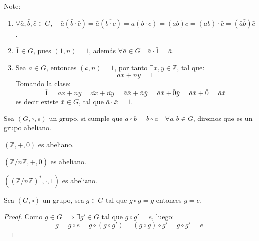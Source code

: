 \begin{enefecto} Note:
	\begin{enumerate}[label=\roman*), font=\normalfont]
		\item $\forall \bar{a}, \bar{b}, \bar{c} \in G, \quad \bar{a}(\bar{b} \cdot \bar{c}) = \bar{a}(\overline{b \cdot c}) = \overline{a(b \cdot c)} = \overline{(ab)c} = \overline{(ab)} \cdot \bar{c} = (\bar{a} \bar{b}) \bar{c}$.
		\item $\bar{1} \in G$, pues $(1, n) = 1$, además $\forall \bar{a} \in G \quad \bar{a} \cdot \bar{1} = \bar{a}$.
		\item Sea $\bar{a} \in G$, entonces $(a, n) = 1$, por tanto $\exists x, y \in \mathbb{Z}$, tal que:
		      \begin{equation*}
			      ax + ny = 1
		      \end{equation*}
		      Tomando la clase:
		      \begin{equation*}
			      \overline{1} = \overline{ax+ny} = \overline{ax} + \overline{ny} = \bar{a}\bar{x} + \bar{n}\bar{y} = \bar{a}\bar{x} + \bar{0}\bar{y} = \bar{a}\bar{x} + \bar{0} = \bar{a}\bar{x}
		      \end{equation*}
		      es decir existe $\bar{x} \in G$, tal que $\bar{a} \cdot \bar{x} = 1$.
	\end{enumerate}
\end{enefecto}

\begin{defi}
	Sea $(G, \circ, e)$ un grupo, si cumple que $a \circ b = b \circ a \quad \forall a, b \in G$, diremos que es un grupo abeliano.
\end{defi}

\begin{eje}
	$(\mathbb{Z}, +, 0)$ es abeliano.
\end{eje}

\begin{eje}
	$(\mathbb{Z}/n\mathbb{Z}, +, \bar{0})$ es abeliano.
\end{eje}

\begin{eje}
	$((\mathbb{Z}/n\mathbb{Z})^*, \cdot, \bar{1})$ es abeliano.
\end{eje}

\begin{prop}
	Sea $(G, \circ)$ un grupo, sea $g \in G$ tal que $g \circ g = g$ entonces $g = e$.
\end{prop}

\begin{proof}
	Como $g \in G \implies \exists g' \in G$ tal que $g \circ g' = e$, luego:
	\begin{equation*}
		g = g \circ e = g \circ (g \circ g') = (g \circ g) \circ g' = g \circ g' = e
	\end{equation*}
\end{proof}

